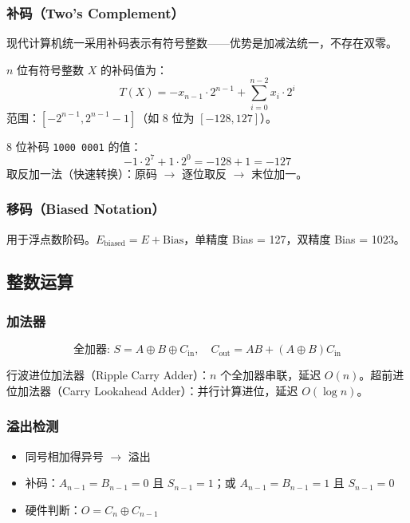 \subsubsection{补码（Two's Complement）}

现代计算机统一采用补码表示有符号整数——优势是加减法统一，不存在双零。

\begin{definition}[补码]
$n$ 位有符号整数 $X$ 的补码值为：
\[
T(X) = -x_{n-1} \cdot 2^{n-1} + \sum_{i=0}^{n-2} x_i \cdot 2^i
\]
范围：$[-2^{n-1}, 2^{n-1}-1]$（如 8 位为 $[-128, 127]$）。
\end{definition}

\begin{example}[补码转换]
8 位补码 \texttt{1000 0001} 的值：
\[
-1 \cdot 2^7 + 1 \cdot 2^0 = -128 + 1 = -127
\]
取反加一法（快速转换）：原码 $\to$ 逐位取反 $\to$ 末位加一。
\end{example}

\subsubsection{移码（Biased Notation）}

用于浮点数阶码。$E_{\text{biased}} = E + \text{Bias}$，单精度 Bias = 127，双精度 Bias = 1023。

\subsection{整数运算}

\subsubsection{加法器}

\[
\text{全加器: } S = A \oplus B \oplus C_{\text{in}}, \quad C_{\text{out}} = AB + (A \oplus B)C_{\text{in}}
\]

行波进位加法器（Ripple Carry Adder）：$n$ 个全加器串联，延迟 $O(n)$。超前进位加法器（Carry Lookahead Adder）：并行计算进位，延迟 $O(\log n)$。

\subsubsection{溢出检测}

\begin{itemize}
    \item 同号相加得异号 $\to$ 溢出
    \item 补码：$A_{n-1}=B_{n-1}=0$ 且 $S_{n-1}=1$；或 $A_{n-1}=B_{n-1}=1$ 且 $S_{n-1}=0$
    \item 硬件判断：$O = C_n \oplus C_{n-1}$
\end{itemize}

